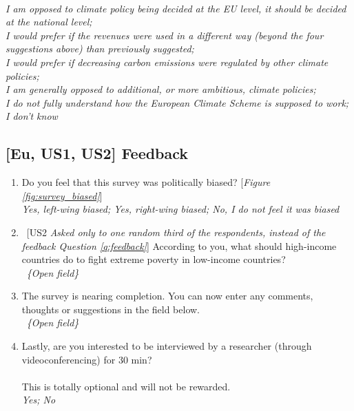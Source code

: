 \begin{enumerate}[resume]
    \\ \textit{I am opposed to climate policy being decided at the EU level, it should be decided at the national level; \\I would prefer if the revenues were used in a different way (beyond the four suggestions above) than previously suggested; \\I would prefer if decreasing carbon emissions were regulated by other climate policies; \\I am generally opposed to additional, or more ambitious, climate policies; \\I do not fully understand how the European Climate Scheme is supposed to work; \\I don't know}
\end{enumerate}

\subsection*{[Eu, US1, US2] Feedback}
\begin{enumerate}[resume]
\item \label{q:survey_biased} Do you feel that this survey was politically biased? [\textit{Figure \ref{fig:survey_biased}}]
\\ \textit{Yes, left-wing biased; Yes, right-wing biased; No, I do not feel it was biased}
\item ~[US2 \textit{Asked only to one random third of the respondents, instead of the feedback Question \ref{q:feedback}}] According to you, what should high-income countries do to fight extreme poverty in low-income countries?
\\ ~\textit{\{Open field\}}
\item \label{q:feedback} The survey is nearing completion. You can now enter any comments, thoughts or suggestions in the field below.
\\ ~\textit{\{Open field\}}
\item Lastly, are you interested to be interviewed by a researcher (through videoconferencing) for 30 min? \\
\\
This is totally optional and will not be rewarded.
\\ \textit{Yes; No}
\end{enumerate}
